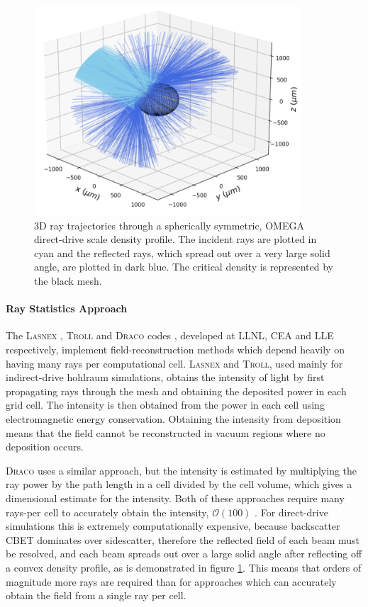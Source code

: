 \begin{figure}[t!]
\includegraphics[width=10cm]{Numerics/Images/Reflected_Rays.png}
\centering
\caption{3D ray trajectories through a spherically symmetric, OMEGA direct-drive scale density profile.
The incident rays are plotted in cyan and the reflected rays, which spread out over a very large solid angle, are plotted in dark blue.
The critical density is represented by the black mesh.}
\label{fig:reflectedrays}
\end{figure}

\paragraph*{Ray Statistics Approach} The \textsc{Lasnex} \cite{strozzi_interplay_2017}, \textsc{Troll} \cite{liberatore_first_2023} and \textsc{Draco} codes \cite{marozas_wavelength-detuning_2018}, developed at \ac{LLNL}, \ac{CEA} and \ac{LLE} respectively, implement field-reconstruction methods which depend heavily on having many rays per computational cell.
\textsc{Lasnex} and \textsc{Troll}, used mainly for indirect-drive hohlraum simulations, obtains the intensity of light by first propagating rays through the mesh and obtaining the deposited power in each grid cell.
The intensity is then obtained from the power in each cell using electromagnetic energy conservation.
Obtaining the intensity from deposition means that the field cannot be reconstructed in vacuum regions where no deposition occurs.

\textsc{Draco} uses a similar approach, but the intensity is estimated by multiplying the ray power by the path length in a cell divided by the cell volume, which gives a dimensional estimate for the intensity.
Both of these approaches require many rays-per cell to accurately obtain the intensity, $\mathcal{O}(100)$ \cite{debayle_unified_2019}.
For direct-drive simulations this is extremely computationally expensive, because backscatter \ac{CBET} dominates over sidescatter, therefore the reflected field of each beam must be resolved, and each beam spreads out over a large solid angle after reflecting off a convex density profile, as is demonstrated in figure \ref{fig:reflectedrays}.
This means that orders of magnitude more rays are required than for approaches which can accurately obtain the field from a single ray per cell.

